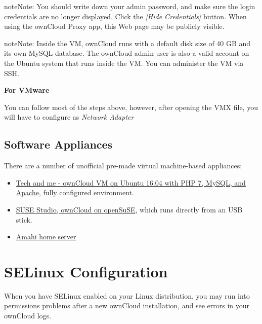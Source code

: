 \documentclass[letterpaper,10pt,english]{sphinxmanual}
\begin{document}
\begin{notice}{note}{Note:}
You should write down your admin password, and make sure the login
credentials are no longer displayed. Click the \emph{{[}Hide Credentials{]}} button.
When using the ownCloud Proxy app, this Web page may be publicly visible.
\end{notice}

\begin{notice}{note}{Note:}
Inside the VM, ownCloud runs with a default disk size of 40 GB and its
own MySQL database. The ownCloud admin user is also a valid account on the
Ubuntu system that runs inside the VM. You can administer the VM via SSH.
\end{notice}

\textbf{For VMware}

You can follow most of the steps above, however, after opening the VMX file, you will have to configure  as \emph{Network Adapter}


\subsection{Software Appliances}
\label{installation/appliance_installation:software-appliances}
There are a number of unofficial pre-made virtual machine-based appliances:
\begin{itemize}
\item {} 
\href{https://www.techandme.se/pre-configured-owncloud-installaton/}{Tech and me - ownCloud VM on Ubuntu 16.04 with PHP 7, MySQL, and Apache}, fully configured
environment.

\item {} 
\href{http://susestudio.com/a/TadMax/owncloud-in-a-box}{SUSE Studio, ownCloud on openSuSE}, which runs directly from an USB stick.

\item {} 
\href{https://wiki.amahi.org/index.php/OwnCloud}{Amahi home server}

\end{itemize}


\section{SELinux Configuration}
\label{installation/selinux_configuration:selinux-config-label}\label{installation/selinux_configuration:synology-package}\label{installation/selinux_configuration::doc}\label{installation/selinux_configuration:selinux-configuration}
When you have SELinux enabled on your Linux distribution, you may run into
permissions problems after a new ownCloud installation, and see  errors in your ownCloud logs.
\end{document}
